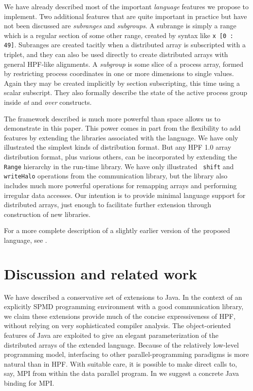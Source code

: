 We have already described most of the important {\em language} features
we propose to implement.  Two additional features that are quite important in
practice but have not been discussed are {\em subranges} and {\em
subgroups}.  A subrange is simply a range which is a regular section of
some other range, created by syntax like \verb$x [0 : 49]$.  Subranges
are created tacitly when a distributed array is subscripted with a
triplet, and they can also be used directly to create distributed
arrays with general HPF-like alignments.  A {\em subgroup} is some
slice of a process array, formed by restricting process coordinates in
one or more dimensions to single values.  Again they may be created
implicitly by section subscripting, this time using a scalar subscript.
They also formally describe the state of the active process group
inside {\em at} and {\em over} constructs.

The framework described is much more powerful than space allows
us to demonstrate in this paper.  This power comes in part from the
flexibility to add features by extending the libraries associated
with the language.  We have only illustrated the simplest kinds of
distribution format.  But any HPF 1.0 array distribution format, plus
various others, can be incorporated by extending the {\tt Range}
hierarchy in the run-time library.  We have only illustrated {\tt
shift} and {\tt writeHalo} operations from the communication library,
but the library also includes much more powerful operations for
remapping arrays and performing irregular data accesses.  Our intention is
to provide minimal language support for distributed arrays, just enough
to facilitate further extension through construction of new libraries.

For a more complete description of a slightly earlier version of
the proposed language, see \cite{JavaAd}.

\section{Discussion and related work}

We have described a conservative set of extensions to Java.  In the
context of an explicitly SPMD programming environment with a good
communication library, we claim these extensions provide much of the
concise expressiveness of HPF, without relying on very sophisticated
compiler analysis.
The object-oriented features of Java
are exploited to give an elegant parameterization of the distributed
arrays of the extended language.
Because of the relatively low-level
programming model, interfacing to other parallel-programming paradigms
is more natural than in HPF.  With suitable care, it is possible to
make direct calls to, say, MPI from within the data parallel
program.  In \cite{JavaMPI} we suggest a concrete Java binding
for MPI.

